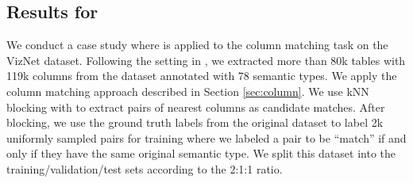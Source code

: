 \subsection{Results for }\label{sec:coltype}

We conduct a case study where \system is applied to the column matching task on the VizNet dataset.
Following the setting in \cite{DBLP:journals/pvldb/ZhangSLHDT20}, we extracted more than 80k tables with 119k columns 
from the dataset annotated with 78 semantic types.
We apply the column matching approach described in Section \ref{sec:column}.
We use kNN blocking with  to extract pairs of nearest columns as candidate matches.
After blocking, we use the ground truth labels 
from the original dataset to label 2k uniformly sampled pairs 
for training where we labeled a pair to be ``match'' 
if and only if they have the same original semantic type.
We split this dataset into the training/validation/test sets according to the 2:1:1 ratio.


